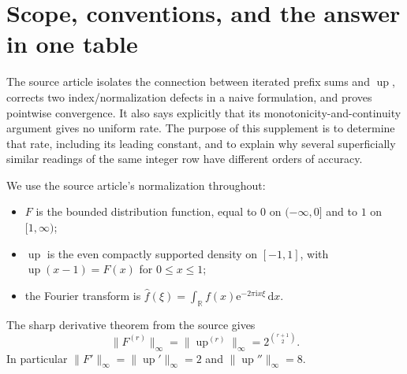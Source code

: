 \documentclass[11pt,oneside]{article}
\theoremstyle{definition}
\theoremstyle{remark}
\newcommand{\R}{\mathbb R}
\newcommand{\Up}{\operatorname{up}}
\newcommand{\e}{\mathrm e}
\newcommand{\ii}{\mathrm i}
\newcommand{\dd}{\,\mathrm d}
\begin{document}
\tableofcontents
\newpage

\section{Scope, conventions, and the answer in one table}
\label{sec:scope}

The source article \cite{reshetnikovExposition} isolates the connection between iterated
prefix sums and $\Up$, corrects two index/normalization defects in a naive formulation, and
proves pointwise convergence.  It also says explicitly that its monotonicity-and-continuity
argument gives no uniform rate.  The purpose of this supplement is to determine that rate,
including its leading constant, and to explain why several superficially similar readings of
the same integer row have different orders of accuracy.

We use the source article's normalization throughout:
\begin{itemize}
\item $F$ is the bounded distribution function, equal to $0$ on $(-\infty,0]$ and to $1$ on
      $[1,\infty)$;
\item $\Up$ is the even compactly supported density on $[-1,1]$, with
      $\Up(x-1)=F(x)$ for $0\le x\le1$;
\item the Fourier transform is
      $\widehat f(\xi)=\int_{\R}f(x)\e^{-2\pi\ii x\xi}\dd x$.
\end{itemize}
The sharp derivative theorem from the source gives
\begin{equation}
 \|F^{(r)}\|_\infty=\|\Up^{(r)}\|_\infty
 =2^{\binom{r+1}{2}}.                                      \label{eq:sharp-derivatives}
\end{equation}
In particular $\|F'\|_\infty=\|\Up'\|_\infty=2$ and
$\|\Up''\|_\infty=8$.
\end{document}
